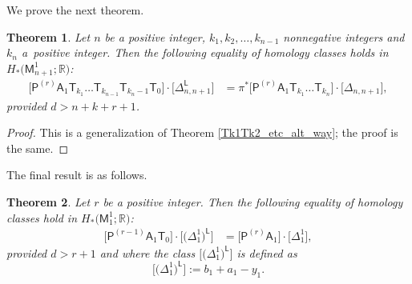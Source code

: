 \documentclass[pdftex]{sigma}
\numberwithin{equation}{section}
\newtheorem{thm}{Theorem}[section]
\begin{document}
We prove the next theorem.

\begin{thm}
\label{Node_whose_one_brunch_tangent at multi}
Let $n$ be a positive integer, $k_1, k_2,\dots, k_{n-1}$ nonnegative integers
and $k_n$ a~positive integer.
Then the following equality of homology classes
holds in $H_*\bigl(\mathsf{M}^1_{n+1}; \mathbb{R}\bigr)$:
\begin{align}
\bigl[\mathsf{P}^{(r)} \mathsf{A}_1 \mathsf{T}_{k_1} \dots \mathsf{T}_{k_{n-1}} \mathsf{T}_{k_n-1} \mathsf{T}_0\bigr] \cdot
\bigl[\Delta_{n, {n+1}}^{\mathsf{L}}\bigr]&  =
\pi^*\bigl[\mathsf{P}^{(r)} \mathsf{A}_1 \mathsf{T}_{k_1} \dots \mathsf{T}_{k_n}] \cdot [\Delta_{n, n+1}\bigr], \label{Tmu_T0_nu_alt_way_A1F}
\end{align}
provided $d > n+k+r+1$.
\end{thm}
\begin{proof}
This is a generalization of Theorem \ref{Tk1Tk2_etc_alt_way}; the proof is the same.
\end{proof}

The final result is as follows.

\begin{thm}
\label{Node_whose_one_brunch_tangent}
Let $r$ be a positive integer.
Then the following equality of homology classes hold in $H_*\bigl(\mathsf{M}^1_1; \mathbb{R}\bigr)$:
\begin{align}
\bigl[\mathsf{P}^{(r-1)} \mathsf{A}_1 \mathsf{T}_0\bigr]\cdot
\bigl[\bigl(\Delta^{1}_{1}\bigr)^{\mathsf{L}}\bigr]
& =  \bigl[\mathsf{P}^{(r)} \mathsf{A}_1\bigr] \cdot \bigl[\Delta^1_1\bigr], \label{p_tang_plower_tang}
\end{align}
provided $d > r+1$ and where the class
$\bigl[\bigl(\Delta^{1}_{1}\bigr)^{\mathsf{L}}\bigr]$ is defined
as
\[ \bigl[\bigl(\Delta^{1}_{1}\bigr)^{\mathsf{L}}\bigr]:= b_1 + a_1-y_1. \]
\end{thm}
\end{document}
